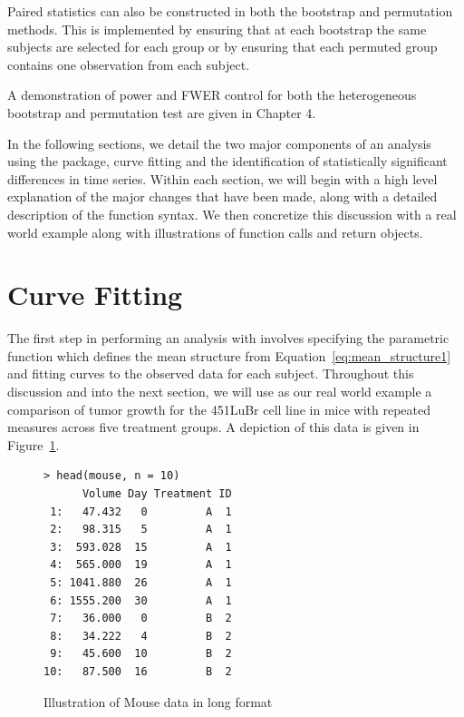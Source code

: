 Paired statistics can also be constructed in both the bootstrap and permutation methods. This is implemented by ensuring that at each bootstrap the same subjects are selected for each group or by ensuring that each permuted group contains one observation from each subject.

A demonstration of power and FWER control for both the heterogeneous bootstrap and permutation test are given in Chapter 4.


In the following sections, we detail the two major components of an analysis using the  package, curve fitting and the identification of statistically significant differences in time series. Within each section, we will begin with a high level explanation of the major changes that have been made, along with a detailed description of the function syntax. We then concretize this discussion with a real world example along with illustrations of function calls and return objects.


\section{Curve Fitting}

The first step in performing an analysis with  involves specifying the parametric function which defines the mean structure from Equation~\ref{eq:mean_structure1} and fitting curves to the observed data for each subject. Throughout this discussion and into the next section, we will use as our real world example a comparison of tumor growth for the 451LuBr cell line in mice with repeated measures across five treatment groups. A depiction of this data is given in Figure~\ref{fig:mouse_head}.

\begin{singlespace}
\begin{figure}[H]
\centering
\begin{BVerbatim}
> head(mouse, n = 10)
      Volume Day Treatment ID
 1:   47.432   0         A  1
 2:   98.315   5         A  1
 3:  593.028  15         A  1
 4:  565.000  19         A  1
 5: 1041.880  26         A  1
 6: 1555.200  30         A  1
 7:   36.000   0         B  2
 8:   34.222   4         B  2
 9:   45.600  10         B  2
10:   87.500  16         B  2
\end{BVerbatim}
\caption{Illustration of Mouse data in long format}
\label{fig:mouse_head}
\end{figure}
\end{singlespace}

